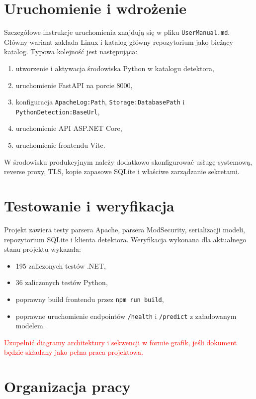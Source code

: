 \documentclass[12pt,a4paper]{article}
\newcommand\todo[1]{\textcolor{red}{#1}}
\newcommand{\code}[1]{\texttt{#1}}
\begin{document}
\section{Uruchomienie i wdrożenie}

Szczegółowe instrukcje uruchomienia znajdują się w pliku \code{UserManual.md}.
Główny wariant zakłada Linux i katalog główny repozytorium jako bieżący katalog.
Typowa kolejność jest następująca:

\begin{enumerate}
    \item utworzenie i aktywacja środowiska Python w katalogu detektora,
    \item uruchomienie FastAPI na porcie 8000,
    \item konfiguracja \code{ApacheLog:Path}, \code{Storage:DatabasePath}
    i \code{PythonDetection:BaseUrl},
    \item uruchomienie API ASP.NET Core,
    \item uruchomienie frontendu Vite.
\end{enumerate}

W środowisku produkcyjnym należy dodatkowo skonfigurować usługę systemową,
reverse proxy, TLS, kopie zapasowe SQLite i właściwe zarządzanie sekretami.

\section{Testowanie i weryfikacja}

Projekt zawiera testy parsera Apache, parsera ModSecurity, serializacji modeli,
repozytorium SQLite i klienta detektora. Weryfikacja wykonana dla aktualnego
stanu projektu wykazała:
\begin{itemize}
    \item 195 zaliczonych testów .NET,
    \item 36 zaliczonych testów Python,
    \item poprawny build frontendu przez \code{npm run build},
    \item poprawne uruchomienie endpointów \code{/health} i \code{/predict}
    z załadowanym modelem.
\end{itemize}

\todo{Uzupełnić diagramy architektury i sekwencji w formie grafik, jeśli dokument
będzie składany jako pełna praca projektowa.}

\section{Organizacja pracy}
\end{document}

